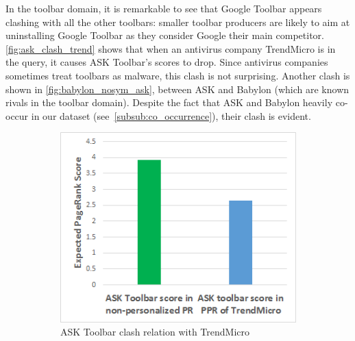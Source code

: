 \documentclass[ijoc,nonblindrev]{informs3} %
\numberwithin{equation}{subsection}
\begin{document}
In the toolbar domain, it is remarkable to see that Google Toolbar appears clashing with all the other toolbars: smaller toolbar producers are likely to aim at uninstalling Google Toolbar as they consider Google their main competitor. \autoref{fig:ask_clash_trend} shows that when an antivirus company TrendMicro is in the query, it causes ASK Toolbar's scores to drop. Since antivirus companies sometimes treat toolbars as malware, this clash is not surprising. Another clash is shown in \autoref{fig:babylon_nosym_ask}, between ASK and Babylon (which are known rivals in the toolbar domain). Despite the fact that ASK and Babylon heavily co-occur in our dataset (see~\autoref{subsub:co_occurrence}), their clash is evident.

\begin{figure}[!htbp]
\centering
\begin{subfigure}[b]{0.4\textwidth}
	\centering
\includegraphics[width=\textwidth]{figures/ask_clash_trend.png}
\caption{ASK Toolbar clash relation with TrendMicro}
\label{fig:ask_clash_trend}
\end{subfigure}
\begin{subfigure}[b]{0.4\textwidth}
	\centering

\end{subfigure}
\end{figure}
\end{document}
